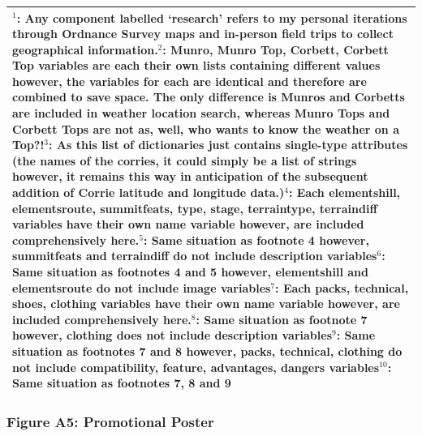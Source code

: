 \documentclass[11pt, english]{article}
\begin{document}
\begin{center}
\begin{longtable}{p{4cm}p{5cm}p{4cm}}
		\multicolumn{3}{p{13.75cm}}{$^1$: Any component labelled `research' refers to my personal iterations through Ordnance Survey maps and in-person field trips to collect geographical information.\newline $^2$: Munro, Munro Top, Corbett, Corbett Top variables are each their own lists containing different values however, the variables for each are identical and therefore are combined to save space. The only difference is Munros and Corbetts are included in weather location search, whereas Munro Tops and Corbett Tops are not as, well, who wants to know the weather on a Top?!\newline $^3$: As this list of dictionaries just contains single-type attributes (the names of the corries, it could simply be a list of strings however, it remains this way in anticipation of the subsequent addition of Corrie latitude and longitude data.)\newline $^4$: Each elementshill, elementsroute, summitfeats, type, stage, terraintype, terraindiff variables have their own name variable however, are included comprehensively here.\newline $^5$: Same situation as footnote 4 however, summitfeats and terraindiff do not include description variables\newline $^6$: Same situation as footnotes 4 and 5 however, elementshill and elementsroute do not include image variables\newline $^7$: Each packs, technical, shoes, clothing variables have their own name variable however, are included comprehensively here.\newline $^8$: Same situation as footnote 7 however, clothing does not include description variables\newline $^9$: Same situation as footnotes 7 and 8 however, packs, technical, clothing do not include compatibility, feature, advantages, dangers variables\newline $^{10}$: Same situation as footnotes 7, 8 and 9}\\
		\hline
	\end{longtable}
	\end{center}

\newpage

		\subsubsection*{Figure A5: Promotional Poster}
\end{document}
